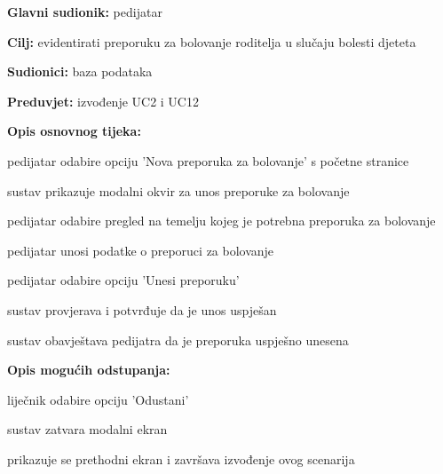 \begin{packed_item}
					\end{packed_item}

                    \noindent {}
					\begin{packed_item}
	
						\item \textbf{Glavni sudionik: }pedijatar
						\item  \textbf{Cilj:} evidentirati preporuku za bolovanje roditelja u slučaju bolesti djeteta
						\item  \textbf{Sudionici:} baza podataka
						\item  \textbf{Preduvjet:} izvođenje UC2 i UC12
						\item  \textbf{Opis osnovnog tijeka:}
						
						\item[] \begin{packed_enum}
	
							\item pedijatar odabire opciju 'Nova preporuka za bolovanje' s početne stranice
							\item sustav prikazuje modalni okvir za unos preporuke za bolovanje
							\item pedijatar odabire pregled na temelju kojeg je potrebna preporuka za bolovanje
							\item pedijatar unosi podatke o preporuci za bolovanje
							\item pedijatar odabire opciju 'Unesi preporuku'
							\item sustav provjerava i potvrđuje da je unos uspješan
							\item sustav obavještava pedijatra da je preporuka uspješno unesena
				
						\end{packed_enum}
						\item  \textbf{Opis mogućih odstupanja:}
						
						\item[] \begin{packed_item}
	
							\item[5.a] liječnik odabire opciju 'Odustani'
							\item [] \begin{packed_enum}
								\item sustav zatvara modalni ekran
								\item prikazuje se prethodni ekran i završava izvođenje ovog scenarija
							\end{packed_enum}
						\end{packed_item}
                    \end{packed_item}
						
